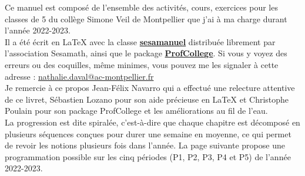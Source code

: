 

Ce manuel est composé de l'ensemble des activités, cours, exercices pour les classes de 5 du collège Simone Veil de Montpellier que j'ai à ma charge durant l'année 2022-2023. \\ [1mm]
Il a été écrit en \LaTeX{} avec la classe \href{https://www.ctan.org/pkg/sesamanuel}{\bf sesamanuel} distribuée librement par l'association Sesamath, ainsi que le package \href{https://www.ctan.org/pkg/ProfCollege}{\bf ProfCollege}. Si vous y voyez des erreurs ou des coquilles, même minimes, vous pouvez me les signaler à cette adresse : \href{mailto:nathalie.daval@ac-montpellier.fr}{nathalie.daval@ac-montpellier.fr} \\
Je remercie à ce propos Jean-Félix Navarro qui a effectué une relecture attentive de ce livret, Sébastien Lozano pour son aide précieuse en \LaTeX{} et Christophe Poulain pour son package ProfCollege et les améliorations au fil de l'eau.  \\ [10mm]

La progression est dite spiralée, c'est-à-dire que chaque \og chapitre \fg{} est décomposé en plusieurs séquences conçues pour durer une semaine en moyenne, ce qui permet de revoir les notions plusieurs fois dans l'année. La page suivante propose une programmation possible sur les cinq périodes (P1, P2, P3, P4 et P5) de l'année 2022-2023.

